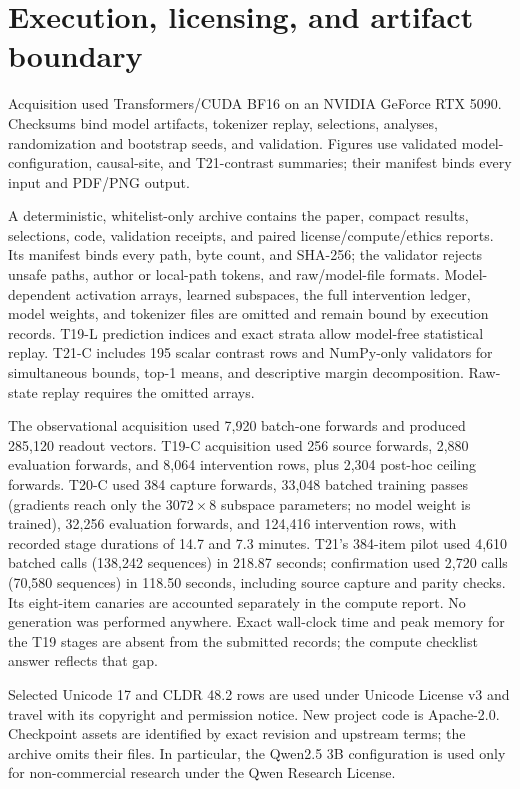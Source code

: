 \documentclass{article}
\begin{document}
\section{Execution, licensing, and artifact boundary}
\label{app:artifact}

Acquisition used Transformers/CUDA BF16 on an NVIDIA GeForce RTX 5090.
Checksums bind model artifacts, tokenizer replay, selections, analyses,
randomization and bootstrap seeds, and validation. Figures use validated
model-configuration, causal-site, and T21-contrast summaries; their manifest
binds every input and PDF/PNG output.

A deterministic, whitelist-only archive contains the paper, compact results,
selections, code, validation receipts, and paired license/compute/ethics reports.
Its manifest binds every path, byte count, and SHA-256; the validator rejects
unsafe paths, author or local-path tokens, and raw/model-file formats.
Model-dependent activation arrays, learned subspaces, the full intervention
ledger, model weights, and tokenizer files are omitted and remain bound by
execution records. T19-L prediction indices and exact strata allow model-free
statistical replay. T21-C includes 195 scalar contrast rows and NumPy-only
validators for simultaneous bounds, top-1 means, and descriptive margin
decomposition. Raw-state replay requires the omitted arrays.

The observational acquisition used 7,920 batch-one forwards and produced
285,120 readout vectors. T19-C acquisition used 256 source forwards, 2,880
evaluation forwards, and 8,064 intervention rows, plus 2,304 post-hoc ceiling
forwards. T20-C used 384 capture forwards, 33,048 batched training passes
(gradients reach only the $3072\times8$ subspace parameters; no model weight
is trained), 32,256 evaluation forwards, and 124,416 intervention rows, with
recorded stage durations of 14.7 and 7.3 minutes. T21's 384-item pilot used
4,610 batched calls (138,242 sequences) in 218.87 seconds; confirmation used
2,720 calls (70,580 sequences) in 118.50 seconds, including source capture and
parity checks. Its eight-item canaries are accounted separately in the
compute report. No generation was performed anywhere. Exact wall-clock time and peak memory for the T19 stages
are absent from the submitted records; the compute checklist answer reflects
that gap.

Selected Unicode 17 and CLDR 48.2 rows are used under Unicode License v3 and
travel with its copyright and permission notice. New project code is
Apache-2.0. Checkpoint assets are identified by exact revision and upstream
terms; the archive omits their files. In particular, the Qwen2.5 3B configuration
is used only for non-commercial research under the Qwen Research License.
\end{document}
